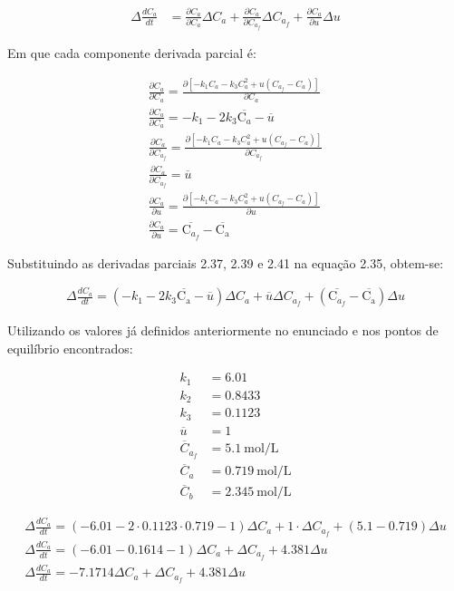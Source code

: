 \documentclass[a4paper,12pt]{report}
\begin{document}
\begin{align}
\Delta\frac{dC_a}{dt} &= \frac{\partial C_a}{\partial C_a}\Delta C_a + \frac{\partial C_a}{\partial C_{a_f}}\Delta C_{a_f} + \frac{\partial C_a}{\partial u}\Delta u
\end{align}

Em que cada componente derivada parcial é:

\begin{align}
\frac{\partial C_a}{\partial C_a} = \frac{\partial [-k_1 C_a - k_3 C_a^2 +u (C_{a_f}-C_a)]}{\partial C_a}\\
\frac{\partial C_a}{\partial C_a} = -k_1-2 k_3 \overline{\mathrm{C}_a} - \overline{u}\\
\frac{\partial C_a}{\partial C_{a_f}} = \frac{\partial [-k_1 C_a - k_3 C_a^2 +u (C_{a_f}-C_a)]}{\partial C_{a_f}}\\
\frac{\partial C_a}{\partial C_{a_f}} = \overline{u}\\
\frac{\partial C_a}{\partial u} = \frac{\partial [-k_1 C_a - k_3 C_a^2 +u (C_{a_f}-C_a)]}{\partial u}\\
\frac{\partial C_a}{\partial u} = \overline{\mathrm{C}_{a_f}} - \overline{\mathrm{C_a}}
\end{align}

Substituindo as derivadas parciais 2.37, 2.39 e 2.41 na equação 2.35, obtem-se:

\begin{align}
\Delta\frac{dC_a}{dt} = (-k_1 - 2 k_3\overline{\mathrm{C_a}}-\overline{u})\Delta C_a + \overline{u}\Delta C_{a_f} + (\overline{\mathrm{C}_{a_f}} - \overline{\mathrm{C_a}})\Delta u
\end{align}

Utilizando os valores já definidos anteriormente no enunciado e nos pontos de equilíbrio encontrados:

\begin{align*}
k_1 &= 6.01 \\
k_2 &= 0.8433 \\
k_3 &= 0.1123 \\
\overline{u} &= 1 \\
\overline{C}_{a_f} &= 5.1 \ \text{mol/L}\\
\overline{C}_a &= 0.719 \ \text{mol/L} \\
\overline{C}_b &= 2.345 \ \text{mol/L}
\end{align*}

\begin{align}
\Delta\frac{dC_a}{dt} = \left(-6.01 - 2 \cdot 0.1123 \cdot 0.719 - 1\right)\Delta C_a + 1 \cdot \Delta C_{a_f} + (5.1 - 0.719)\Delta u \\
\Delta\frac{dC_a}{dt} = \left(-6.01 - 0.1614 - 1\right)\Delta C_a + \Delta C_{a_f} + 4.381\Delta u \\
\Delta\frac{dC_a}{dt} = -7.1714 \Delta C_a + \Delta C_{a_f} + 4.381\Delta u \\
\end{align}
\end{document}

